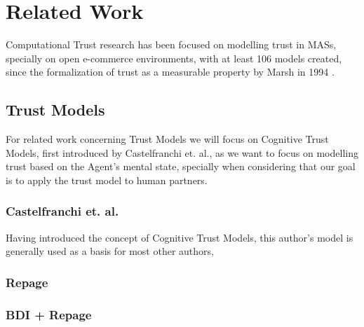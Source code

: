 

\section{Related Work}
\label{sec:Related Work}
Computational Trust research has been focused on modelling trust in \acp{MAS}, specially on open e-commerce environments\cite{Granatyr2015, HanYu2013, Pinyol2013, Noorian2010, Huang2008}, with at least 106 models created\cite{Granatyr2015}, since the formalization of trust as a measurable property by Marsh in 1994 \cite{Marsh1994}.

\subsection{Trust Models}
\label{subsec:Related work:Trust Models}
For related work concerning Trust Models we will focus on Cognitive Trust Models, first introduced by Castelfranchi et. al.\cite{Castelfranchi1998}, as we want to focus on modelling trust based on the Agent's mental state, specially when considering that our goal is to apply the trust model to human partners.

\subsubsection{Castelfranchi et. al.}
Having introduced the concept of Cognitive Trust Models, this author's model is generally used as a basis for most other authors, %

\subsubsection{Repage}

\subsubsection{BDI + Repage}

